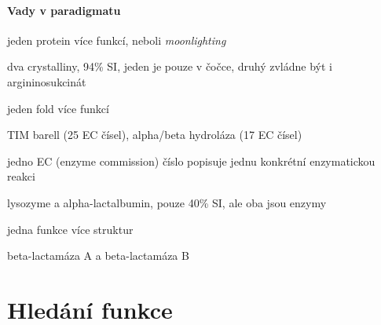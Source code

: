 \documentclass[DIV=8]{scrreprt}
\begin{document}

\paragraph{Vady v paradigmatu}
\begin{myItemize}[nosep]
    \item jeden protein více funkcí, neboli \emph{moonlighting}
\begin{myItemize}[nosep]
    \item dva crystalliny, 94\% SI, jeden je pouze v čočce, druhý zvládne být i argininosukcinát
\end{myItemize}

    \item jeden fold více funkcí
\begin{myItemize}[nosep]
    \item TIM barell (25 EC čísel), alpha/beta hydroláza (17 EC čísel)
\begin{myItemize}[nosep]
    \item jedno EC (enzyme commission) číslo popisuje jednu konkrétní enzymatickou reakci
\end{myItemize}

    \item lysozyme a alpha-lactalbumin, pouze 40\% SI, ale oba jsou enzymy
\end{myItemize}

    \item jedna funkce více struktur
\begin{myItemize}[nosep]
    \item beta-lactamáza A a beta-lactamáza B
\end{myItemize}

\end{myItemize}



\section{Hledání funkce} \label{Hledání funkce} \FloatBarrier
\end{document}
